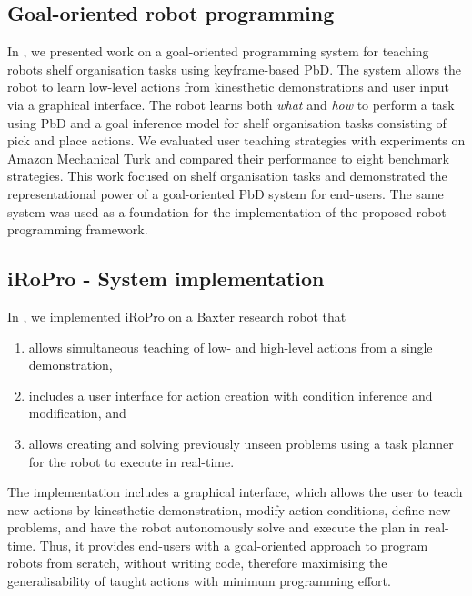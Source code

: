 \subsection {Goal-oriented robot programming}
In , we presented work on a goal-oriented programming system for teaching robots shelf organisation tasks using keyframe-based PbD. 
The system allows the robot to learn low-level actions from kinesthetic demonstrations and user input via a graphical interface.
The robot learns both \textit{what} and \textit{how} to perform a task using PbD and a goal inference model for shelf organisation tasks consisting of pick and place actions.
We evaluated user teaching strategies with experiments on Amazon Mechanical Turk and compared their performance to eight benchmark strategies.
This work focused on shelf organisation tasks and demonstrated the representational power of a goal-oriented PbD system for end-users. 
The same system was used as a foundation for the implementation of the proposed robot programming framework.

	
\subsection{iRoPro - System implementation}
In , we implemented iRoPro on a Baxter research robot that 
		\begin{enumerate}
			\item allows simultaneous teaching of low- and high-level actions from a single demonstration, 
			\item includes a user interface for action creation with condition inference and modification, and
			\item allows creating and solving previously unseen problems using a task planner for the robot to execute in real-time.
		\end{enumerate}
The implementation includes a graphical interface, which allows the user to teach new actions by kinesthetic demonstration, modify action conditions, define new problems, and have the robot autonomously solve and execute the plan in real-time.
Thus, it provides end-users with a goal-oriented approach to program robots from scratch, without writing code, therefore maximising the generalisability of taught actions with minimum programming effort.
	
